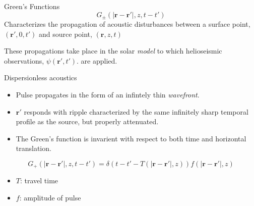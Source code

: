 \documentclass{beamer}
\begin{document}

\begin{frame}{Green's Functions}
    $$ G_{\pm}(|\mathbf{r}-\mathbf{r}'|,z,t-t') $$
    Characterizes the propagation of acoustic disturbances
    between a surface point,
    $(\mathbf{r}',0,t')$ and source point, $(\mathbf{r},z,t)$

    These propagations take place in the solar \emph{model}
    to which helioseismic observations, $\psi(\mathbf{r}',t')$.  are applied.
\end{frame}

\begin{frame}{Dispersionless acoustics}
    \begin{itemize}
        \item Pulse propagates in the form of an infintely thin \emph{wavefront}.
        \item $\mathbf{r}'$ responds with ripple characterized
            by the same infinitely sharp temporal profile as the source,
            but properly attenuated.
        \item The Green's function is invarient with
            respect to both time and horizontal translation.
    \end{itemize}
    $$ G_{+}(|\mathbf{r}-\mathbf{r}'|,z,t-t') =
    \delta\left(t-t'-T\left(|\mathbf{r}-\mathbf{r}'|,z\right)\right)
       f\left(|\mathbf{r}-\mathbf{r}'|,z\right)$$
       \begin{itemize}
           \item $T$: travel time
           \item $f$: amplitude of pulse
       \end{itemize}
\end{frame}
\end{document}
